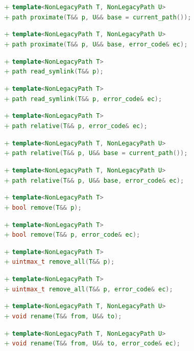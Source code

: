 \documentclass[11pt]{article}
\newcommand{\code}[2][cpp]{\lstinline[language=#1,basicstyle=\small\ttfamily]{#2}}
\newcommand{\tsreplace}[3]{\textcolor{red}{\sout{#1}}#2\textcolor{darkgreen}{#3}}
\begin{document}
\tsreplace{}{}{+ \code{template<NonLegacyPath T, NonLegacyPath U>}}\\
\tsreplace{}{}{+ \code{path proximate(T&& p, U&& base = current_path());}}

\tsreplace{}{}{+ \code{template<NonLegacyPath T, NonLegacyPath U>}}\\
\tsreplace{}{}{+ \code{path proximate(T&& p, U&& base, error_code& ec);}}

\tsreplace{}{}{+ \code{template<NonLegacyPath T>}}\\
\tsreplace{}{}{+ \code{path read_symlink(T&& p);}}

\tsreplace{}{}{+ \code{template<NonLegacyPath T>}}\\
\tsreplace{}{}{+ \code{path read_symlink(T&& p, error_code& ec);}}

\tsreplace{}{}{+ \code{template<NonLegacyPath T>}}\\
\tsreplace{}{}{+ \code{path relative(T&& p, error_code& ec);}}

\tsreplace{}{}{+ \code{template<NonLegacyPath T, NonLegacyPath U>}}\\
\tsreplace{}{}{+ \code{path relative(T&& p, U&& base = current_path());}}

\tsreplace{}{}{+ \code{template<NonLegacyPath T, NonLegacyPath U>}}\\
\tsreplace{}{}{+ \code{path relative(T&& p, U&& base, error_code& ec);}}

\tsreplace{}{}{+ \code{template<NonLegacyPath T>}}\\
\tsreplace{}{}{+ \code{bool remove(T&& p);}}

\tsreplace{}{}{+ \code{template<NonLegacyPath T>}}\\
\tsreplace{}{}{+ \code{bool remove(T&& p, error_code& ec);}}

\tsreplace{}{}{+ \code{template<NonLegacyPath T>}}\\
\tsreplace{}{}{+ \code{uintmax_t remove_all(T&& p);}}

\tsreplace{}{}{+ \code{template<NonLegacyPath T>}}\\
\tsreplace{}{}{+ \code{uintmax_t remove_all(T&& p, error_code& ec);}}

\tsreplace{}{}{+ \code{template<NonLegacyPath T, NonLegacyPath U>}}\\
\tsreplace{}{}{+ \code{void rename(T&& from, U&& to);}}

\tsreplace{}{}{+ \code{template<NonLegacyPath T, NonLegacyPath U>}}\\
\tsreplace{}{}{+ \code{void rename(T&& from, U&& to, error_code& ec);}}
\end{document}
